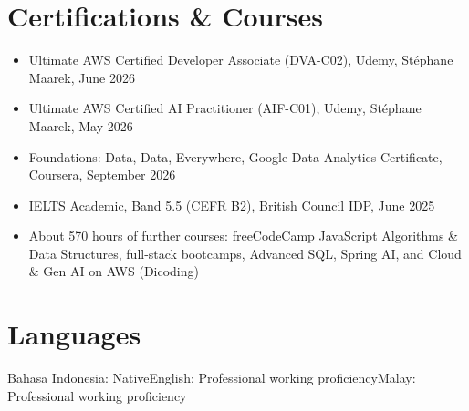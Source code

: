 \documentclass[a4paper,10pt]{article}
\newcommand{\sep}{\hspace{0.6em}{\color{muted}|}\hspace{0.6em}}
\begin{document}
\section*{Certifications \& Courses}
\begin{itemize}
  \item Ultimate AWS Certified Developer Associate (DVA-C02), Udemy, St\'ephane Maarek, June 2026
  \item Ultimate AWS Certified AI Practitioner (AIF-C01), Udemy, St\'ephane Maarek, May 2026
  \item Foundations: Data, Data, Everywhere, Google Data Analytics Certificate, Coursera, September 2026
  \item IELTS Academic, Band 5.5 (CEFR B2), British Council IDP, June 2025
  \item About 570 hours of further courses: freeCodeCamp JavaScript Algorithms \& Data Structures,
        full-stack bootcamps, Advanced SQL, Spring AI, and Cloud \& Gen AI on AWS (Dicoding)
\end{itemize}

\section*{Languages}
Bahasa Indonesia: Native\sep English: Professional working proficiency\sep Malay: Professional working proficiency
\end{document}
